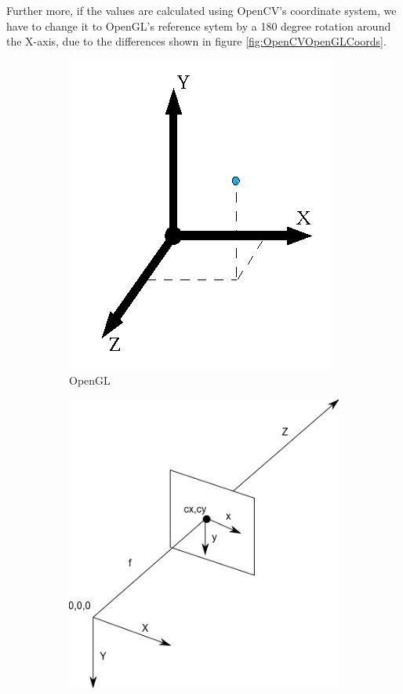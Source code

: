 \documentclass[]{article}
\begin{document}
\begin{itemize}
Further more, if the values are calculated using OpenCV's coordinate system, we have to change it to OpenGL's reference sytem by a 180 degree rotation around the X-axis, due to the differences shown in figure \ref{fig:OpenCVOpenGLCoords}. 

\begin{figure}[!hbtp]
\centering
\begin{subfigure}{.5\textwidth}
  \centering
  \includegraphics[width=0.9\linewidth]{figures/OpenGLCoords.jpg}
  \caption{OpenGL}
  \label{fig:OpenGLCoordinateSystem}
\end{subfigure}%
\begin{subfigure}{.5\textwidth}
  \centering
  \includegraphics[width=0.9\linewidth]{figures/OpenCVCoords.png}

\end{subfigure}
\end{figure}
\end{itemize}
\end{document}
